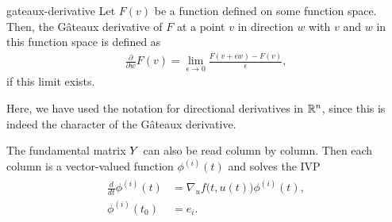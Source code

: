 \begin{Definition}{gateaux-derivative}
  Let $F(v)$ be a function defined on some function space. Then, the Gâteaux
  derivative of $F$ at a point $v$ in direction $w$ with $v$ and $w$
  in this function space is defined as
  \begin{gather}
    \label{eq:derivatives:6}
    \frac{\partial}{\partial w} F(v)
    = \lim_{\epsilon\to 0} \frac{F(v+\epsilon w) - F(v)}{\epsilon},
  \end{gather}
  if this limit exists.
  
  Here, we have used the notation for directional derivatives in
  $\mathbb R^n$, since this is indeed the character of the Gâteaux
  derivative.
  
\end{Definition}



\begin{remark}
  The fundamental matrix $Y$ can also be read column
  by column.  Then each column is a vector-valued function
  $\phi^{(i)}(t)$ and solves the IVP
  \begin{gather*}
    \begin{split}
      \tfrac{d}{dt}\phi^{(i)}(t) &= \nabla_u
      f\bigl(t,u(t)\bigr)\phi^{(i)}(t),
      \\
      \phi^{(i)}(t_0) &= e_i.
    \end{split}
  \end{gather*}
\end{remark}

